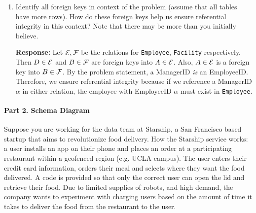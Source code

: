 \documentclass{report}
\renewcommand{\it}[1]{\textit{{#1}}}
\renewcommand{\bf}[1]{\textbf{{#1}}}
\renewcommand{\tt}[1]{\texttt{{#1}}}
\begin{document}
\begin{enumerate}[label=(\alph*)]
    \item Identify all foreign keys in context of the problem (assume that all tables have more 
        rows). How do these foreign keys help us ensure referential integrity in this context? Note 
        that there may be more than you initially believe. \vspace{2pt}

        \bf{Response:} Let $\cal{E}, \cal{F}$ be the relations for \tt{Employee}, \tt{Facility} 
        respectively. Then $D \in \cal{E}$ and $B \in \cal{F}$ are foreign keys into $A \in \cal{E}$.
        Also, $A \in \cal{E}$ is a foreign key into $B \in \cal{F}$.
        By the problem statement, a ManagerID \it{is} an EmployeeID. Therefore, we ensure referential
        integrity because if we reference a ManagerID $\alpha$ in either relation, the employee 
        with EmployeeID $\alpha$ must exist in \tt{Employee}.
\end{enumerate}

\newpage
\paragraph{Part 2. Schema Diagram}
Suppose you are working for the data team at Starship, a San Francisco based startup that aims to 
revolutionize food delivery. How the Starship service works: a user installs an app on their phone 
and places an order at a participating restaurant within a geofenced region (e.g. UCLA campus). The 
user enters their credit card information, orders their meal and selects where they want the food 
delivered. A code is provided so that only the correct user can open the lid and retrieve their 
food. Due to limited supplies of robots, and high demand, the company wants to experiment with 
charging users based on the amount of time it takes to deliver the food from the restaurant to the 
user. \vspace{10pt}
\end{document}
